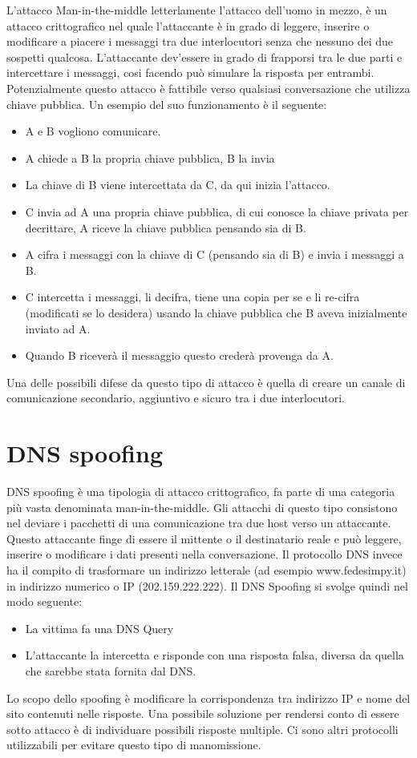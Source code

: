 L’attacco Man-in-the-middle letterlamente l’attacco dell’uomo in mezzo, è un attacco crittografico nel quale l’attaccante è in grado di leggere, inserire o modificare a piacere i messaggi tra due interlocutori senza che nessuno dei due sospetti qualcosa.
L’attaccante dev’essere in grado di frapporsi tra le due parti e intercettare i messaggi, cosi facendo può simulare la risposta per entrambi.
Potenzialmente questo attacco è fattibile verso qualsiasi conversazione che utilizza chiave pubblica.
Un esempio del suo funzionamento è il seguente:
\begin{itemize}
\item	A e B vogliono comunicare.
\item	A chiede a B la propria chiave pubblica, B la invia
\item	La chiave di B viene intercettata da C, da qui inizia l’attacco.
\item	C invia ad A una propria chiave pubblica, di cui conosce la chiave privata per decrittare, A riceve la chiave pubblica pensando sia di B.
\item	A cifra i messaggi con la chiave di C (pensando sia di B) e invia i messaggi a B.
\item	C intercetta i messaggi, li decifra, tiene una copia per se e li re-cifra (modificati se lo desidera) usando la chiave pubblica che B aveva inizialmente inviato ad A.
\item	Quando B riceverà il messaggio questo crederà provenga da A.
\end{itemize}
Una delle possibili difese da questo tipo di attacco è quella di creare un canale di comunicazione secondario, aggiuntivo e sicuro tra i due interlocutori.

\section{DNS spoofing}

DNS spoofing è una tipologia di attacco crittografico, fa parte di una categoria più vasta denominata man-in-the-middle. Gli attacchi di questo tipo consistono nel deviare i pacchetti di una comunicazione tra due host verso un attaccante. Questo attaccante finge di essere il mittente o il destinatario reale e può leggere, inserire o modificare i dati presenti nella conversazione.
Il protocollo DNS invece ha il compito di trasformare un indirizzo letterale (ad esempio www.fedesimpy.it) in indirizzo numerico o IP (202.159.222.222).
Il DNS Spoofing si svolge quindi nel modo seguente: 
\begin{itemize}
\item	La vittima fa una DNS Query
\item	L’attaccante la intercetta e risponde con una risposta falsa, diversa da quella che sarebbe stata fornita dal DNS.
\end{itemize}
Lo scopo dello spoofing è modificare la corrispondenza tra indirizzo IP e nome del sito contenuti nelle risposte.
Una possibile soluzione per rendersi conto di essere sotto attacco è di individuare possibili risposte multiple. Ci sono altri protocolli utilizzabili per evitare questo tipo di manomissione.

